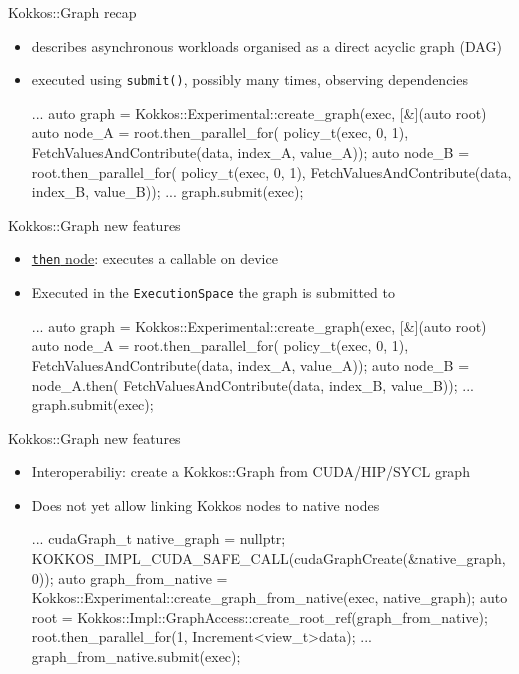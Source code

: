\begin{frame}[fragile]{Kokkos::Graph recap}
 \begin{itemize}
     \item describes asynchronous workloads organised as a direct acyclic graph (DAG)
     \item executed using \texttt{submit()}, possibly many times, observing dependencies
      \begin{code}[keywords={auto}]
    ...
    auto graph = Kokkos::Experimental::create_graph(exec, [&](auto root) {
      auto node_A = root.then_parallel_for(
                    policy_t(exec, 0, 1),
                    FetchValuesAndContribute(data, index_A, value_A));
      auto node_B = root.then_parallel_for(
                    policy_t(exec, 0, 1),
                    FetchValuesAndContribute(data, index_B, value_B));}
    ...
    graph.submit(exec);
     \end{code}
 \end{itemize}
\end{frame}

\begin{frame}[fragile]{Kokkos::Graph new features}
 \begin{itemize}
  \item \href{https://github.com/kokkos/kokkos/pull/7629}{\texttt{then} node}: executes a callable on device
   \item Executed in the \texttt{ExecutionSpace} the graph is submitted to
     \begin{code}[keywords={auto}]
    ...
    auto graph = Kokkos::Experimental::create_graph(exec, [&](auto root) {
      auto node_A = root.then_parallel_for(
                    policy_t(exec, 0, 1),
                    FetchValuesAndContribute(data, index_A, value_A));
      auto node_B = node_A.then(
                    FetchValuesAndContribute(data, index_B, value_B));}
    ...
    graph.submit(exec);
     \end{code}
 \end{itemize}
\end{frame}

\begin{frame}[fragile]{Kokkos::Graph new features}
 \begin{itemize}
   \item Interoperabiliy: create a Kokkos::Graph from CUDA/HIP/SYCL graph
   \item Does not yet allow linking Kokkos nodes to native nodes
     \begin{code}[keywords={auto}]
    ...
    cudaGraph_t native_graph = nullptr;
    KOKKOS_IMPL_CUDA_SAFE_CALL(cudaGraphCreate(&native_graph, 0));
    auto graph_from_native =
      Kokkos::Experimental::create_graph_from_native(exec, native_graph);
    auto root = Kokkos::Impl::GraphAccess::create_root_ref(graph_from_native);
    root.then_parallel_for(1, Increment<view_t>{data});
    ...
    graph_from_native.submit(exec);
     \end{code}
 \end{itemize}
\end{frame}

